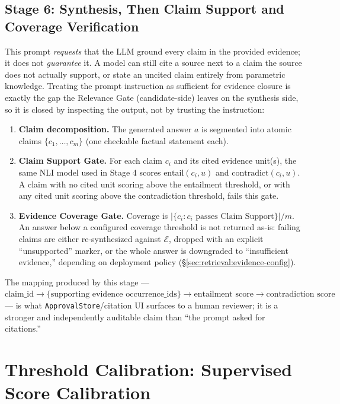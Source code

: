 \subsection{Stage 6: Synthesis, Then Claim Support and Coverage Verification}
\label{sec:retrieval:synthesis}

This prompt \emph{requests} that the LLM ground every claim in the provided evidence; it does not \emph{guarantee} it. A model can still cite a source next to a claim the source does not actually support, or state an uncited claim entirely from parametric knowledge. Treating the prompt instruction as sufficient for evidence closure is exactly the gap the Relevance Gate (candidate-side) leaves on the synthesis side, so it is closed by inspecting the output, not by trusting the instruction:

\begin{enumerate}
  \item \textbf{Claim decomposition.} The generated answer $a$ is segmented into atomic claims $\{c_1, \dots, c_m\}$ (one checkable factual statement each).
  \item \textbf{Claim Support Gate.} For each claim $c_i$ and its cited evidence unit(s), the same NLI model used in Stage 4 scores $\text{entail}(c_i, u)$ and $\text{contradict}(c_i, u)$. A claim with no cited unit scoring above the entailment threshold, or with any cited unit scoring above the contradiction threshold, fails this gate.
  \item \textbf{Evidence Coverage Gate.} Coverage is $|\{c_i : c_i \text{ passes Claim Support}\}| / m$. An answer below a configured coverage threshold is not returned as-is: failing claims are either re-synthesized against $\mathcal{E}$, dropped with an explicit ``unsupported'' marker, or the whole answer is downgraded to ``insufficient evidence,'' depending on deployment policy (\S\ref{sec:retrieval:evidence-config}).
\end{enumerate}

The mapping produced by this stage --- $\text{claim\_id} \to \{\text{supporting evidence occurrence\_ids}\} \to \text{entailment score} \to \text{contradiction score}$ --- is what \texttt{ApprovalStore}/citation UI surfaces to a human reviewer; it is a stronger and independently auditable claim than ``the prompt asked for citations.''

\section{Threshold Calibration: Supervised Score Calibration}
\label{sec:retrieval:calibration}


